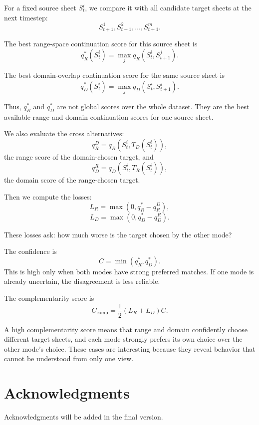  For a fixed source sheet \(S_t^i\), we compare it with all candidate target sheets at the next timestep:
  \[
  S_{t+1}^1, S_{t+1}^2, \ldots, S_{t+1}^m .
  \]

  The best range-space continuation score for this source sheet is
  \[
  q_R^\ast(S_t^i)
  =
  \max_j q_R(S_t^i,S_{t+1}^j).
  \]

  The best domain-overlap continuation score for the same source sheet is
  \[
  q_D^\ast(S_t^i)
  =
  \max_j q_D(S_t^i,S_{t+1}^j).
  \]

  Thus, \(q_R^\ast\) and \(q_D^\ast\) are not global scores over the whole dataset. They are the best available range and
  domain continuation scores for one source sheet.



  We also evaluate the cross alternatives:
  \[
  q_R^D
  =
  q_R(S_t^i,T_D(S_t^i)),
  \]
  the range score of the domain-chosen target, and
  \[
  q_D^R
  =
  q_D(S_t^i,T_R(S_t^i)),
  \]
  the domain score of the range-chosen target.

  Then we compute the losses:
  \[
  L_R = \max(0, q_R^* - q_R^D),
  \]
  \[
  L_D = \max(0, q_D^* - q_D^R).
  \]

  These losses ask: how much worse is the target chosen by the other mode?

  The confidence is
  \[
  C = \min(q_R^*, q_D^*).
  \]
  This is high only when both modes have strong preferred matches. If one mode is already uncertain, the disagreement is
  less reliable.

  The complementarity score is
  \[
  C_{\mathrm{comp}}
  =
  \frac{1}{2}(L_R+L_D)C.
  \]

  A high complementarity score means that range and domain confidently choose different target sheets, and each mode
  strongly prefers its own choice over the other mode's choice. These cases are interesting because they reveal behavior
  that cannot be understood from only one view.





\section*{Acknowledgments}

Acknowledgments will be added in the final version.





